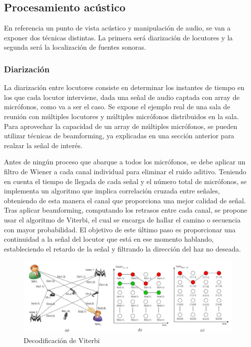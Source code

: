 \documentclass[a4paper,11pt]{book}
\begin{document}
		\subsection{Procesamiento acústico}
		En referencia un punto de vista acústico y manipulación de audio, se van a exponer dos técnicas distintas. La primera será diarización de locutores y la segunda será la localización de fuentes sonoras.
			\subsubsection{Diarización}
			La diarización entre locutores consiste en determinar los instantes de tiempo en los que cada locutor interviene, dada una señal de audio captada con array de micrófonos, como va a ser el caso. Se expone el ejemplo real de una sala de reunión con múltiples locutores y múltiples micrófonos distribuidos en la sala. Para aprovechar la capacidad de un array de múltiples micrófonos, se pueden utilizar técnicas de beamforming, ya explicadas en una sección anterior para realzar la señal de interés.
			
			Antes de ningún proceso que abarque a todos los micrófonos, se debe aplicar un filtro de Wiener a cada canal individual para eliminar el ruido aditivo. Teniendo en cuenta el tiempo de llegada de cada señal y el número total de micrófonos, se implementa un algoritmo que implica correlación cruzada entre señales, obteniendo de esta manera el canal que proporciona una mejor calidad de señal. Tras aplicar beamforming, computando los retrasos entre cada canal, se propone usar el algoritmo de Viterbi, el cual se encarga de hallar el camino o secuencia con mayor probabilidad. El objetivo de este último paso es proporcionar una continuidad a la señal del locutor que está en ese momento hablando, estableciendo el retardo de la señal y filtrando la dirección del haz no deseada.	
			\begin{figure}[hbtp]
			\centering
			\includegraphics[width = 13cm]{FIGURAS/diarizacion.JPG}
			\caption{Decodificación de Viterbi}
			\end{figure}	
			
\end{document}
